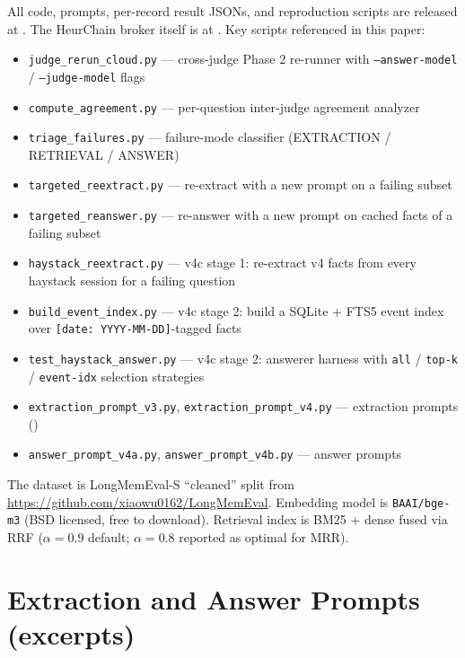 \documentclass{article}
\begin{document}
All code, prompts, per-record result JSONs, and reproduction scripts are released at \citep{heurchain_benchmarks_repo}. The HeurChain broker itself is at \citep{heurchain_repo}. Key scripts referenced in this paper:

\begin{itemize}
  \item \texttt{judge\_rerun\_cloud.py} --- cross-judge Phase 2 re-runner with \texttt{--answer-model} / \texttt{--judge-model} flags
  \item \texttt{compute\_agreement.py} --- per-question inter-judge agreement analyzer
  \item \texttt{triage\_failures.py} --- failure-mode classifier (EXTRACTION / RETRIEVAL / ANSWER)
  \item \texttt{targeted\_reextract.py} --- re-extract with a new prompt on a failing subset
  \item \texttt{targeted\_reanswer.py} --- re-answer with a new prompt on cached facts of a failing subset
  \item \texttt{haystack\_reextract.py} --- v4c stage 1: re-extract v4 facts from every haystack session for a failing question
  \item \texttt{build\_event\_index.py} --- v4c stage 2: build a SQLite + FTS5 event index over \texttt{[date: YYYY-MM-DD]}-tagged facts
  \item \texttt{test\_haystack\_answer.py} --- v4c stage 2: answerer harness with \texttt{all} / \texttt{top-k} / \texttt{event-idx} selection strategies
  \item \texttt{extraction\_prompt\_v3.py}, \texttt{extraction\_prompt\_v4.py} --- extraction prompts ()
  \item \texttt{answer\_prompt\_v4a.py}, \texttt{answer\_prompt\_v4b.py} --- answer prompts
\end{itemize}

The dataset is LongMemEval-S ``cleaned'' split from \url{https://github.com/xiaowu0162/LongMemEval}. Embedding model is \texttt{BAAI/bge-m3} (BSD licensed, free to download). Retrieval index is BM25 + dense fused via RRF ($\alpha = 0.9$ default; $\alpha = 0.8$ reported as optimal for MRR).




\appendix

\section{Extraction and Answer Prompts (excerpts)}
\label{app:prompts}
\end{document}
